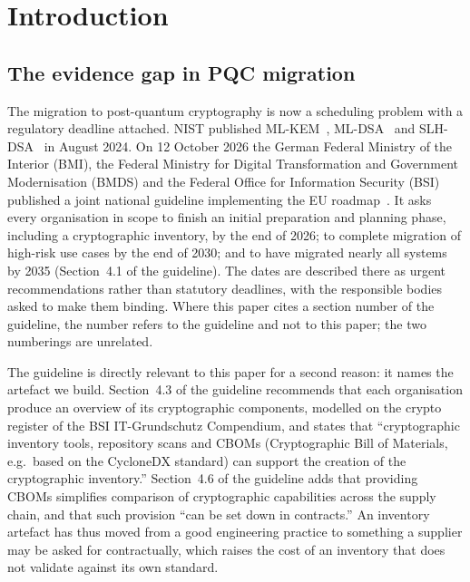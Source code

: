 \section{Introduction}
\label{sec:intro}

\subsection{The evidence gap in PQC migration}

The migration to post-quantum cryptography is now a scheduling problem with a
regulatory deadline attached. NIST published ML-KEM~\cite{nist-fips203}, ML-DSA~\cite{nist-fips204} and
SLH-DSA~\cite{nist-fips205} in August 2024. On 12 October 2026 the German
Federal Ministry of the Interior (BMI), the Federal Ministry for Digital
Transformation and Government Modernisation (BMDS) and the Federal Office for
Information Security (BSI) published a joint national guideline implementing
the EU roadmap~\cite{bsi-pqc-migration}. It asks every organisation in scope to
finish an initial preparation and planning phase, including a cryptographic
inventory, by the end of 2026; to complete migration of high-risk use cases by
the end of 2030; and to have migrated nearly all systems by 2035
(Section~4.1 of the guideline). The dates are described there as urgent
recommendations rather than statutory deadlines, with the responsible bodies
asked to make them binding. Where this paper cites a section number of the
guideline, the number refers to the guideline and not to this paper; the two
numberings are unrelated.

The guideline is directly relevant to this paper for a second reason: it names
the artefact we build. Section~4.3 of the guideline recommends that each
organisation produce an overview of its cryptographic components, modelled on
the crypto register of the BSI IT-Grundschutz Compendium, and states that
``cryptographic inventory tools, repository scans and CBOMs (Cryptographic Bill
of Materials, e.g.\ based on the CycloneDX standard) can support the creation of
the cryptographic inventory.'' Section~4.6 of the guideline adds that providing
CBOMs simplifies comparison of cryptographic capabilities across the supply
chain, and that such provision ``can be set down in contracts.'' An inventory
artefact has thus moved from a good engineering practice to something a supplier
may be asked for contractually, which raises the cost of an inventory that does
not validate against its own standard.


